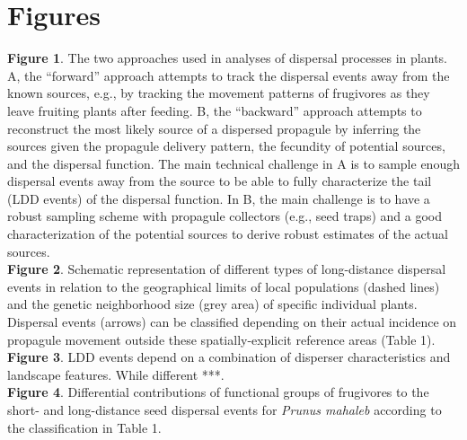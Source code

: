 \documentclass[a4paper, 12pt]{article}
\begin{document}
\section*{Figures}
\begin{linenumbers}

\textbf{Figure 1}. The two approaches used in analyses of dispersal processes in plants. A, the “forward” approach attempts to track the dispersal events away from the known sources, e.g., by tracking the movement patterns of frugivores as they leave fruiting plants after feeding. B, the “backward” approach  attempts to reconstruct the most likely source of a dispersed propagule by inferring the sources given the propagule delivery pattern, the fecundity of potential sources, and the dispersal function. The main technical challenge in A is to sample enough dispersal events away from the source to be able to fully characterize the tail (LDD events) of the dispersal function. In B, the main challenge is to have a robust sampling scheme with propagule collectors (e.g., seed traps) and a good characterization of the potential sources to derive robust estimates of the actual sources.\\
 
\textbf{Figure 2}. Schematic representation of different types of long-distance dispersal events in relation to the geographical limits of local populations (dashed lines) and the genetic neighborhood size (grey area) of specific individual plants. Dispersal events (arrows) can be classified depending on their actual incidence on propagule movement outside these spatially-explicit reference areas (Table 1).\\
 
\textbf{Figure 3}. LDD events depend on a combination of disperser characteristics and landscape features. While different ***.\\
 
\textbf{Figure 4}. Differential contributions of functional groups of frugivores to the short- and long-distance seed dispersal events for \textit{Prunus mahaleb} according to the classification in Table 1.\\ 
\newpage


\end{linenumbers}
\end{document}
